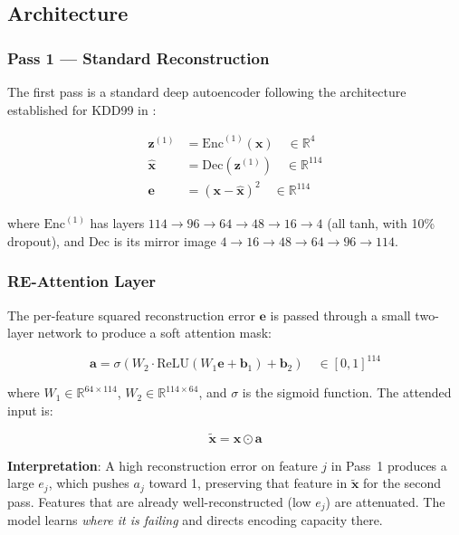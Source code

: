 \documentclass[12pt,a4paper]{article}
\begin{document}
\subsection{Architecture}

\subsubsection{Pass 1 --- Standard Reconstruction}

The first pass is a standard deep autoencoder following the architecture
established for KDD99 in \citet{ae_analysis_nids}:

\begin{align}
\mathbf{z}^{(1)} &= \text{Enc}^{(1)}(\mathbf{x})
    \quad \in \mathbb{R}^{4} \label{eq:enc1}\\
\hat{\mathbf{x}} &= \text{Dec}(\mathbf{z}^{(1)})
    \quad \in \mathbb{R}^{114} \label{eq:dec}\\
\mathbf{e} &= (\mathbf{x} - \hat{\mathbf{x}})^2
    \quad \in \mathbb{R}^{114} \label{eq:error}
\end{align}

\noindent
where $\text{Enc}^{(1)}$ has layers
$114 \to 96 \to 64 \to 48 \to 16 \to 4$ (all tanh, with 10\% dropout),
and $\text{Dec}$ is its mirror image $4 \to 16 \to 48 \to 64 \to 96 \to 114$.

\subsubsection{RE-Attention Layer}

The per-feature squared reconstruction error $\mathbf{e}$ is passed through
a small two-layer network to produce a soft attention mask:

\begin{equation}
\mathbf{a} = \sigma\!\left(W_2 \cdot \text{ReLU}(W_1 \mathbf{e} + \mathbf{b}_1) + \mathbf{b}_2\right)
    \quad \in [0,1]^{114}
\label{eq:attention}
\end{equation}

\noindent
where $W_1 \in \mathbb{R}^{64 \times 114}$, $W_2 \in \mathbb{R}^{114 \times 64}$,
and $\sigma$ is the sigmoid function. The attended input is:

\begin{equation}
\tilde{\mathbf{x}} = \mathbf{x} \odot \mathbf{a}
\label{eq:attended}
\end{equation}

\noindent
\textbf{Interpretation}: A high reconstruction error on feature $j$ in Pass~1
produces a large $e_j$, which pushes $a_j$ toward 1, preserving that feature
in $\tilde{\mathbf{x}}$ for the second pass. Features that are already
well-reconstructed (low $e_j$) are attenuated. The model learns
\emph{where it is failing} and directs encoding capacity there.
\end{document}
